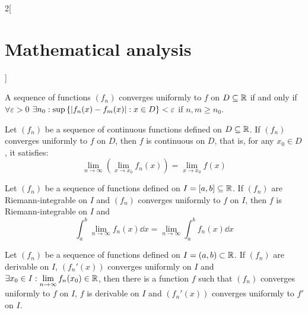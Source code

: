 \documentclass[../../../main.tex]{subfiles}
\begin{document}
\begin{multicols}{2}[\section{Mathematical analysis}]
\begin{theorem}
    A sequence of functions $(f_n)$ converges uniformly to $f$ on $D\subseteq\mathbb{R} $ if and only if $\forall\varepsilon>0$ $\displaystyle\exists n_0:\sup\left\{|f_n(x)-f_m(x)|:\\ x\in D\right\}< \varepsilon$ if $n,m\geq n_0$.
  \end{theorem}
  \begin{theorem}
    Let $(f_n)$ be a sequence of continuous functions defined on $D\subseteq\mathbb{R} $. If $(f_n)$ converges uniformly to $f$ on $D$, then $f$ is continuous on $D$, that is, for any $x_0\in D$, it satisfies: $$\lim_{n\to\infty}\left(\lim_{x\to x_0} f_n(x)\right)=\lim_{x\to x_0} f(x)$$
  \end{theorem}
  \begin{theorem}
    Let $(f_n)$ be a sequence of functions defined on  $I=[a,b]\subseteq\mathbb{R} $. If $(f_n)$ are Riemann-integrable on $I$ and $(f_n)$ converges uniformly to $f$ on $I$, then $f$ is Riemann-integrable on $I$ and $$\int_a^b\lim_{n\to\infty} f_n(x) \dd{x}=\lim_{n\to\infty} \int_a^bf_n(x) \dd{x}$$
  \end{theorem}
  \begin{theorem}
    Let $(f_n)$ be a sequence of functions defined on $I=(a,b)\subset\mathbb{R} $. If $(f_n)$ are derivable on $I$, $(f_n'(x))$ converges uniformly on $I$ and $\displaystyle\exists x_0\in I: \lim_{n\to\infty}f_n(x_0)\in\mathbb{R} $, then there is a function $f$ such that $(f_n)$ converges uniformly to $f$ on $I$, $f$ is derivable on $I$ and $(f_n'(x))$ converges uniformly to $f'$ on $I$.
  \end{theorem}

\end{multicols}
\end{document}
